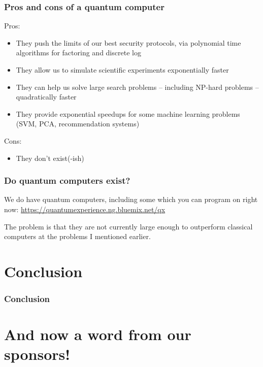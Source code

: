 \documentclass[]{beamer}
\begin{document}
\begin{frame}[noframenumbering]
\frametitle{Pros and cons of a quantum computer}

Pros:
\begin{itemize}
\item They push the limits of our best security protocols, via polynomial time algorithms for factoring and discrete log
\item They allow us to simulate scientific experiments exponentially faster
\item They can help us solve large search problems -- including NP-hard problems -- quadratically faster
\item They provide exponential speedups for some machine learning problems (SVM, PCA, recommendation systems)
\end{itemize}

Cons:
\begin{itemize}
\item They don't exist(-ish)
\end{itemize}
\end{frame}

\begin{frame}
\frametitle{Do quantum computers exist?}

We do have quantum computers, including some which you can program on right now: \url{https://quantumexperience.ng.bluemix.net/qx}

The problem is that they are not currently large enough to outperform classical computers at the problems I mentioned earlier.
\end{frame}

\section{Conclusion}

\begin{frame}
\frametitle{Conclusion}



\end{frame}

\section{And now a word from our sponsors!}
\end{document}
